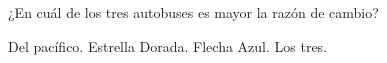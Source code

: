 ¿En cuál de los tres autobuses es mayor la razón de cambio?

\begin{choices}
    \CorrectChoice Del pacífico.
    \choice Estrella Dorada.
    \choice Flecha Azul.
    \choice Los tres.
\end{choices}
